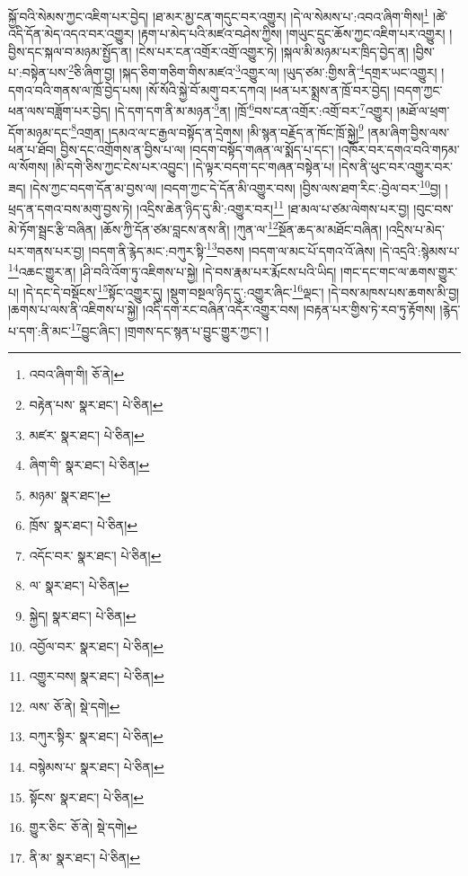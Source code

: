 སྐྱོ་བའི་སེམས་ཀྱང་འཇིག་པར་བྱེད། །ཐ་མར་མྱ་ངན་གདུང་བར་འགྱུར། །དེ་ལ་སེམས་པ་:འབའ་ཞིག་གིས།\footnote{འབའ་ཞིག་གི།  ཅོ་ནེ། } །ཚེ་འདི་དོན་མེད་འདའ་བར་འགྱུར། །རྟག་པ་མེད་པའི་མཛའ་བཤེས་ཀྱིས། །གཡུང་དྲུང་ཆོས་ཀྱང་འཇིག་པར་འགྱུར། །བྱིས་དང་སྐལ་བ་མཉམ་སྤྱོད་ན། །ངེས་པར་ངན་འགྲོར་འགྲོ་འགྱུར་ཏེ། །སྐལ་མི་མཉམ་པར་ཁྲིད་བྱེད་ན། །བྱིས་པ་:བསྟེན་པས་\footnote{བརྟེན་པས་  སྣར་ཐང་།  པེ་ཅིན། }ཅི་ཞིག་བྱ། །སྐད་ཅིག་གཅིག་གིས་མཛའ་\footnote{མཛར་  སྣར་ཐང་།  པེ་ཅིན། }འགྱུར་ལ། །ཡུད་ཙམ་:གྱིས་ནི་\footnote{ཞིག་གི་  སྣར་ཐང་།  པེ་ཅིན། }དགྲར་ཡང་འགྱུར། །དགའ་བའི་གནས་ལ་ཁྲོ་བྱེད་པས། །སོ་སོའི་སྐྱེ་བོ་མགུ་བར་དཀའ། །ཕན་པར་སྨྲས་ན་ཁྲོ་བར་བྱེད། །བདག་ཀྱང་ཕན་ལས་བཟློག་པར་བྱེད། །དེ་དག་དག་ནི་མ་མཉན་\footnote{མཉམ་  སྣར་ཐང་། }ན། །ཁྲོ་\footnote{ཁྲོས་  སྣར་ཐང་།  པེ་ཅིན། }བས་ངན་འགྲོར་:འགྲོ་བར་\footnote{འདོང་བར་  སྣར་ཐང་།  པེ་ཅིན། }འགྱུར། །མཐོ་ལ་ཕྲག་དོག་མཉམ་དང་\footnote{ལ་  སྣར་ཐང་།  པེ་ཅིན། }འགྲན། །དམའ་ལ་ང་རྒྱལ་བསྟོད་ན་དྲེགས། །མི་སྙན་བརྗོད་ན་ཁོང་ཁྲོ་སྐྱེ།\footnote{སྐྱེད།  སྣར་ཐང་།  པེ་ཅིན། } །ནམ་ཞིག་བྱིས་ལས་ཕན་པ་ཐོབ། བྱིས་དང་འགྲོགས་ན་བྱིས་པ་ལ། །བདག་བསྟོད་གཞན་ལ་སྨོད་པ་དང་། །འཁོར་བར་དགའ་བའི་གཏམ་ལ་སོགས། །མི་དགེ་ཅིས་ཀྱང་ངེས་པར་འབྱུང་། །དེ་ལྟར་བདག་དང་གཞན་བསྟེན་པ། །དེས་ནི་ཕུང་བར་འགྱུར་བར་ཟད། །དེས་ཀྱང་བདག་དོན་མ་བྱས་ལ། །བདག་ཀྱང་དེ་དོན་མི་འགྱུར་བས། །བྱིས་ལས་ཐག་རིང་:བྱེལ་བར་\footnote{འབྱོལ་བར་  སྣར་ཐང་།  པེ་ཅིན། }བྱ། །ཕྲད་ན་དགའ་བས་མགུ་བྱས་ཏེ། །འདྲིས་ཆེན་ཉིད་དུ་མི་:འགྱུར་བར།\footnote{འགྱུར་བས།  སྣར་ཐང་།  པེ་ཅིན། } །ཐ་མལ་པ་ཙམ་ལེགས་པར་བྱ། །བུང་བས་མེ་ཏོག་སྦྲང་རྩི་བཞིན། །ཆོས་ཀྱི་དོན་ཙམ་བླངས་ནས་ནི། །ཀུན་ལ་\footnote{ལས་  ཅོ་ནེ།  སྡེ་དགེ། }སྔོན་ཆད་མ་མཐོང་བཞིན། །འདྲིས་པ་མེད་པར་གནས་པར་བྱ། །བདག་ནི་རྙེད་མང་:བཀུར་སྟི་\footnote{བཀུར་སྟིར་  སྣར་ཐང་།  པེ་ཅིན། }བཅས། །བདག་ལ་མང་པོ་དགའ་འོ་ཞེས། །དེ་འདྲའི་:སྙེམས་པ་\footnote{བསྙེམས་པ་  སྣར་ཐང་།  པེ་ཅིན། }འཆང་གྱུར་ན། །ཤི་བའི་འོག་ཏུ་འཇིགས་པ་སྐྱེ། །དེ་བས་རྣམ་པར་རྨོངས་པའི་ཡིད། །གང་དང་གང་ལ་ཆགས་གྱུར་པ། །དེ་དང་དེ་བསྡོངས་\footnote{སྟོངས་  སྣར་ཐང་།  པེ་ཅིན། }སྟོང་འགྱུར་དུ། །སྡུག་བསྔལ་ཉིད་དུ་:འགྱུར་ཞིང་\footnote{གྱུར་ཅིང་  ཅོ་ནེ།  སྡེ་དགེ། }ལྡང་། །དེ་བས་མཁས་པས་ཆགས་མི་བྱ། །ཆགས་པ་ལས་ནི་འཇིགས་པ་སྐྱེ། །འདི་དག་རང་བཞིན་འདོར་འགྱུར་བས། །བརྟན་པར་གྱིས་ཏེ་རབ་ཏུ་རྟོགས། །རྙེད་པ་དག་:ནི་མང་\footnote{ནི་མ་  སྣར་ཐང་།  པེ་ཅིན། }བྱུང་ཞིང་། །གྲགས་དང་སྙན་པ་བྱུང་གྱུར་ཀྱང་། །
